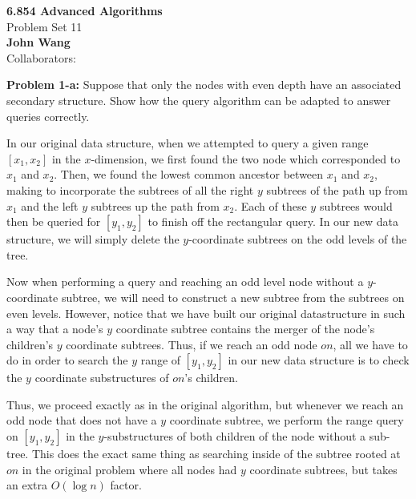\documentclass[psamsfonts]{amsart}
\newenvironment{sol}{\vspace{0.25cm}{\large \bfseries Solution:}}{\qedsymbol}
\newenvironment{prob}[1]{\begin{framed}{\large \bfseries Problem #1:}}{\end{framed}}
\newcommand{\makenewtitle}{
    \begin{center}
    {\huge \bfseries 6.854 Advanced Algorithms} \\
    Problem Set 11\\
    \vspace{0.25cm}
    {\bfseries John Wang} \\
    Collaborators:  
    \end{center}
    \vspace{0.5cm}
}
\begin{document}
\makenewtitle

\begin{prob}{1-a}
Suppose that only the nodes with even depth have an associated secondary structure. Show how the query algorithm can be adapted to answer queries correctly.
\end{prob}
\begin{sol}
In our original data structure, when we attempted to query a given range $[x_1, x_2]$ in the $x$-dimension, we first found the two node which corresponded to $x_1$ and $x_2$. Then, we found the lowest common ancestor between $x_1$ and $x_2$, making to incorporate the subtrees of all the right $y$ subtrees of the path up from $x_1$ and the left $y$ subtrees up the path from $x_2$. Each of these $y$ subtrees would then be queried for $[y_1, y_2]$ to finish off the rectangular query. In our new data structure, we will simply delete the $y$-coordinate subtrees on the odd levels of the tree. 

Now when performing a query and reaching an odd level node without a $y$-coordinate subtree, we will need to construct a new subtree from the subtrees on even levels. However, notice that we have built our original datastructure in such a way that a node's $y$ coordinate subtree contains the merger of the node's children's $y$ coordinate subtrees. Thus, if we reach an odd node $on$, all we have to do in order to search the $y$ range of $[y_1, y_2]$ in our new data structure is to check the $y$ coordinate substructures of $on$'s children.

Thus, we proceed exactly as in the original algorithm, but whenever we reach an odd node that does not have a $y$ coordinate subtree, we perform the range query on $[y_1, y_2]$ in the $y$-substructures of both children of the node without a sub-tree. This does the exact same thing as searching inside of the subtree rooted at $on$ in the original problem where all nodes had $y$ coordinate subtrees, but takes an extra $O(\log n)$ factor.
\end{sol}
\end{document}
